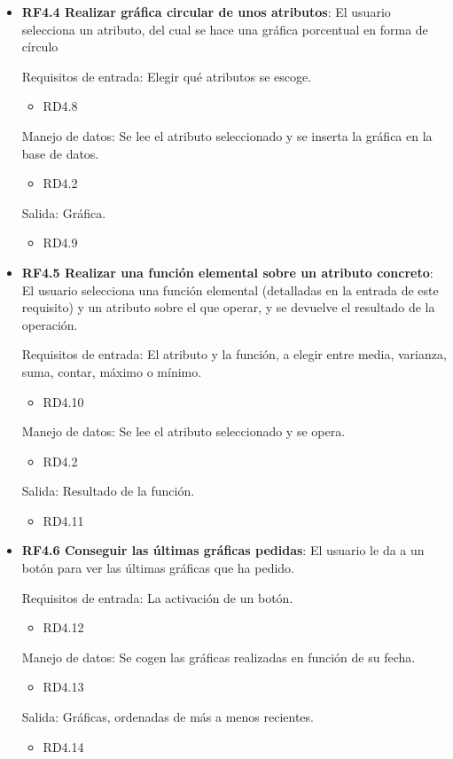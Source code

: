 \begin{itemize}
	\item \textbf{RF4.4 Realizar gráfica circular de unos atributos}: El usuario selecciona un atributo, del cual se hace una gráfica porcentual en forma de círculo
	
	Requisitos de entrada: Elegir qué atributos se escoge.
	\begin{itemize}
		\item RD4.8
	\end{itemize}
	Manejo de datos: Se lee el atributo seleccionado y se inserta la gráfica en la base de datos.
	\begin{itemize}
		\item RD4.2
	\end{itemize}
	Salida: Gráfica.
	\begin{itemize}
		\item RD4.9
	\end{itemize}
	
	\item \textbf{RF4.5 Realizar una función elemental sobre un atributo concreto}: El usuario selecciona una función elemental (detalladas en la entrada de este requisito) y un atributo sobre el que operar, y se devuelve el resultado de la operación.
	
	Requisitos de entrada: El atributo y la función, a elegir entre media, varianza, suma, contar, máximo o mínimo.
	\begin{itemize}
		\item RD4.10
	\end{itemize}
	Manejo de datos: Se lee el atributo seleccionado y se opera.
	\begin{itemize}
		\item RD4.2
	\end{itemize}
	Salida: Resultado de la función.
	\begin{itemize}
		\item RD4.11
	\end{itemize}
	
	\item \textbf{RF4.6 Conseguir las últimas gráficas pedidas}: El usuario le da a un botón para ver las últimas gráficas que ha pedido.
	
	Requisitos de entrada: La activación de un botón.
	\begin{itemize}
		\item RD4.12
	\end{itemize}
	Manejo de datos: Se cogen las gráficas realizadas en función de su fecha.
	\begin{itemize}
		\item RD4.13
	\end{itemize}
	Salida: Gráficas, ordenadas de más a menos recientes.
	\begin{itemize}
		\item RD4.14
	\end{itemize}
	
\end{itemize}

